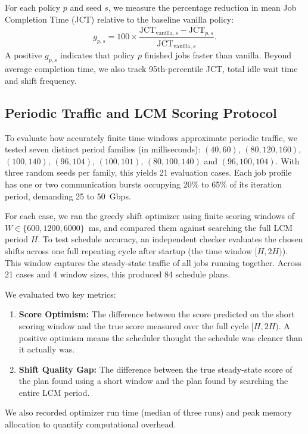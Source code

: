 \documentclass[conference]{IEEEtran}
\begin{document}
For each policy $p$ and seed $s$, we measure the percentage reduction in mean Job Completion Time (JCT) relative to the baseline vanilla policy:
\begin{equation}
 g_{p,s} = 100 \times \frac{\overline{\mathrm{JCT}}_{\text{vanilla},s} - \overline{\mathrm{JCT}}_{p,s}}{\overline{\mathrm{JCT}}_{\text{vanilla},s}}.
 \label{eq:paired-gain}
\end{equation}
A positive $g_{p,s}$ indicates that policy $p$ finished jobs faster than vanilla. Beyond average completion time, we also track 95th-percentile JCT, total idle wait time and shift frequency.

\subsection{Periodic Traffic and LCM Scoring Protocol}

To evaluate how accurately finite time windows approximate periodic traffic, we tested seven distinct period families (in milliseconds):
$(40, 60)$, $(80, 120, 160)$, $(100, 140)$, $(96, 104)$, $(100, 101)$, $(80, 100, 140)$ and $(96, 100, 104)$.
With three random seeds per family, this yields 21 evaluation cases. Each job profile has one or two communication bursts occupying 20\% to 65\% of its iteration period, demanding 25 to 50~Gbps.

For each case, we ran the greedy shift optimizer using finite scoring windows of $W \in \{600, 1200, 6000\}$~ms, and compared them against searching the full LCM period $H$. To test schedule accuracy, an independent checker evaluates the chosen shifts across one full repeating cycle after startup (the time window $[H, 2H)$). This window captures the steady-state traffic of all jobs running together. Across 21 cases and 4 window sizes, this produced 84 schedule plans.

We evaluated two key metrics:
\begin{enumerate}
    \item \textbf{Score Optimism:} The difference between the score predicted on the short scoring window and the true score measured over the full cycle $[H, 2H)$. A positive optimism means the scheduler thought the schedule was cleaner than it actually was.
    \item \textbf{Shift Quality Gap:} The difference between the true steady-state score of the plan found using a short window and the plan found by searching the entire LCM period.
\end{enumerate}
We also recorded optimizer run time (median of three runs) and peak memory allocation to quantify computational overhead.
\end{document}
